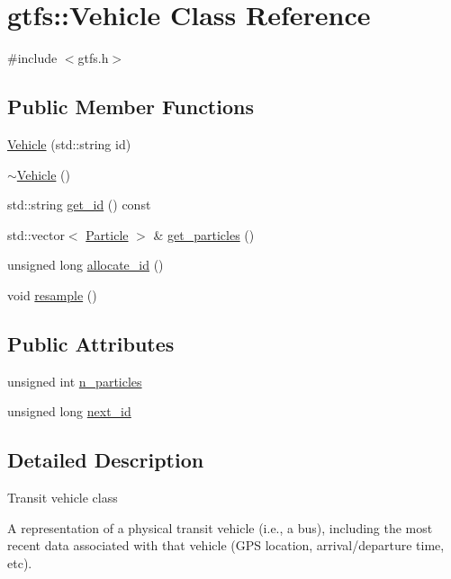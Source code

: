 \hypertarget{classgtfs_1_1Vehicle}{}\section{gtfs\+:\+:Vehicle Class Reference}
\label{classgtfs_1_1Vehicle}


{\ttfamily \#include $<$gtfs.\+h$>$}

\subsection*{Public Member Functions}
\begin{DoxyCompactItemize}
\item 
\hyperlink{classgtfs_1_1Vehicle_ac3f8111a611378f5f8b29f7465e48919}{Vehicle} (std\+::string id)
\item 
\hyperlink{classgtfs_1_1Vehicle_a08c7450dd0df9406f78b30be044d27d8}{$\sim$\+Vehicle} ()
\item 
std\+::string \hyperlink{classgtfs_1_1Vehicle_a1586a271d8c8d7eb61f6f1fac5491e26}{get\+\_\+id} () const 
\item 
std\+::vector$<$ \hyperlink{classgtfs_1_1Particle}{Particle} $>$ \& \hyperlink{classgtfs_1_1Vehicle_a7b12b079c68880f00f532ca25858c368}{get\+\_\+particles} ()
\item 
unsigned long \hyperlink{classgtfs_1_1Vehicle_aa9087e973a9821f384ec47f51bdcedc7}{allocate\+\_\+id} ()
\item 
void \hyperlink{classgtfs_1_1Vehicle_a46ee9775d11595461315be7141359d8a}{resample} ()
\end{DoxyCompactItemize}
\subsection*{Public Attributes}
\begin{DoxyCompactItemize}
\item 
unsigned int \hyperlink{classgtfs_1_1Vehicle_aa21babc8423abf92bbdf5e0748444f44}{n\+\_\+particles}
\item 
unsigned long \hyperlink{classgtfs_1_1Vehicle_aab535dd9953f9650e2adc351965779b1}{next\+\_\+id}
\end{DoxyCompactItemize}


\subsection{Detailed Description}
Transit vehicle class

A representation of a physical transit vehicle (i.\+e., a bus), including the most recent data associated with that vehicle (G\+PS location, arrival/departure time, etc).

